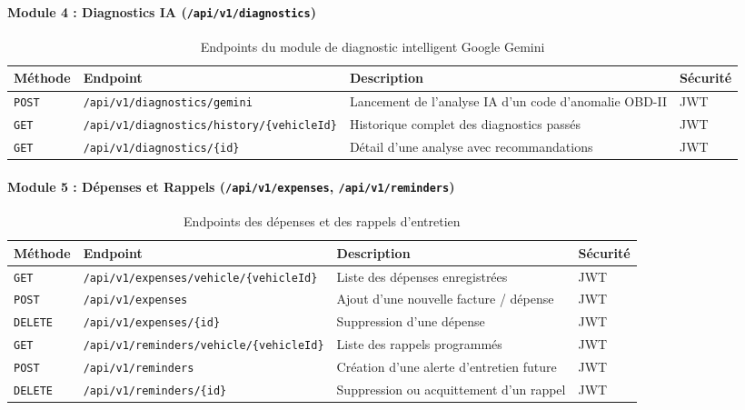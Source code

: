 \documentclass[12pt,a4paper,oneside]{report}
\begin{document}
\paragraph{Module 4 : Diagnostics IA (\texttt{/api/v1/diagnostics})}
\begin{table}[H]
\centering
\small
\begin{tabularx}{\textwidth}{p{1.4cm} p{5.5cm} X p{1.6cm}}
\toprule
\textbf{M\'ethode} & \textbf{Endpoint} & \textbf{Description} & \textbf{S\'ecurit\'e} \\
\midrule
\texttt{POST} & \texttt{/api/v1/diagnostics/gemini} & Lancement de l'analyse IA d'un code d'anomalie OBD-II & JWT \\
\texttt{GET} & \texttt{/api/v1/diagnostics/history/\{vehicleId\}} & Historique complet des diagnostics pass\'es & JWT \\
\texttt{GET} & \texttt{/api/v1/diagnostics/\{id\}} & D\'etail d'une analyse avec recommandations & JWT \\
\bottomrule
\end{tabularx}
\caption{Endpoints du module de diagnostic intelligent Google Gemini}
\end{table}

\paragraph{Module 5 : D\'epenses et Rappels (\texttt{/api/v1/expenses}, \texttt{/api/v1/reminders})}
\begin{table}[H]
\centering
\small
\begin{tabularx}{\textwidth}{p{1.4cm} p{5cm} X p{1.6cm}}
\toprule
\textbf{M\'ethode} & \textbf{Endpoint} & \textbf{Description} & \textbf{S\'ecurit\'e} \\
\midrule
\texttt{GET} & \texttt{/api/v1/expenses/vehicle/\{vehicleId\}} & Liste des d\'epenses enregistr\'ees & JWT \\
\texttt{POST} & \texttt{/api/v1/expenses} & Ajout d'une nouvelle facture / d\'epense & JWT \\
\texttt{DELETE} & \texttt{/api/v1/expenses/\{id\}} & Suppression d'une d\'epense & JWT \\
\texttt{GET} & \texttt{/api/v1/reminders/vehicle/\{vehicleId\}} & Liste des rappels programm\'es & JWT \\
\texttt{POST} & \texttt{/api/v1/reminders} & Cr\'eation d'une alerte d'entretien future & JWT \\
\texttt{DELETE} & \texttt{/api/v1/reminders/\{id\}} & Suppression ou acquittement d'un rappel & JWT \\
\bottomrule
\end{tabularx}
\caption{Endpoints des d\'epenses et des rappels d'entretien}
\end{table}
\end{document}
